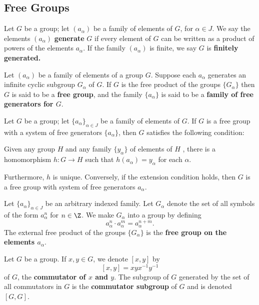 \subsection{Free Groups}

\begin{definition}[Generate]
Let $G$ be a group; let $(a_\alpha)$ be a family of elements of $G$, for $\alpha \in J$. We say the elements 
$(a_\alpha)$ \textbf{generate} $G$ if every element of $G$ can be written as a product of powers of the elements $a_\alpha$. 
If the family $(a_\alpha)$ is finite, we say $G$ is \textbf{finitely generated.}
\end{definition}

\begin{definition}
Let $(a_\alpha)$ be a family of elements of a group $G$. Suppose each $a_\alpha$ generates an infinite cyclic subgroup $G_\alpha$ of $G$. 
If $G$ is the free product of the groups $\{ G_\alpha \}$ then $G$ is said to be a \textbf{free group}, 
and the family $\{ a_\alpha \}$ is said to be a \textbf{family of free generators for $G$}.
\end{definition}

\begin{lemma}
    Let $G$ be a group; let $\{ a_\alpha \}_{\alpha \in J}$ be a family of elements of $G$. If $G$ is a free group with a system of free generators $\{ a_\alpha \}$, then $G$ satisfies the following condition:
        
    \begin{addmargin}{1em}
        Given any group $H$ and any family $\{ y_\alpha \}$ of elements of $H$ , 
        there is a homomorphism $h \colon G \rightarrow H$ such that $h(a_\alpha) = y_\alpha$ for each $\alpha$. 
    \end{addmargin}
    
    Furthermore, $h$ is unique. Conversely, if the extension condition holds, then $G$ is a free group with system of free generators $a_\alpha$.
\end{lemma}

\begin{definition}
Let $\{ a_\alpha \}_{\alpha \in J}$ be an arbitrary indexed family. Let $G_\alpha$ denote the set of all symbols of the form $a_\alpha^n$ for $n \in \Z$. We make $G_\alpha$ into a group by defining
\[
    a_\alpha^n \cdot a_\alpha^m = a_\alpha^{n+m}.
\]
The external free product of the groups $\{ G_\alpha \}$ is the \textbf{free group on the elements $a_\alpha$}. 
\end{definition}

\begin{definition}
Let $G$ be a group. If $x, y \in G$, we denote $[x, y]$ by
\[
    [x, y] = xyx^{-1}y^{-1}
\]
of $G$, the \textbf{commutator of $x$ and $y$}. The subgroup of $G$ generated by the set of all commutators in $G$ is the \textbf{commutator subgroup} of $G$ and is denoted $[G, G]$. 
\end{definition}